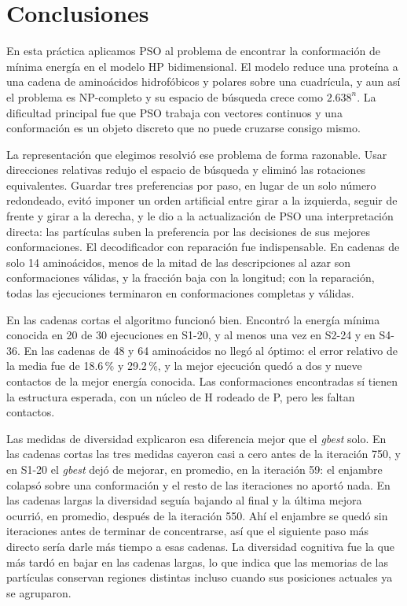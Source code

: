 \section{Conclusiones}

En esta práctica aplicamos PSO al problema de encontrar la conformación de mínima energía en el modelo HP bidimensional. El modelo reduce una proteína a una cadena de aminoácidos hidrofóbicos y polares sobre una cuadrícula, y aun así el problema es NP-completo y su espacio de búsqueda crece como $2.638^n$. La dificultad principal fue que PSO trabaja con vectores continuos y una conformación es un objeto discreto que no puede cruzarse consigo mismo.

La representación que elegimos resolvió ese problema de forma razonable. Usar direcciones relativas redujo el espacio de búsqueda y eliminó las rotaciones equivalentes. Guardar tres preferencias por paso, en lugar de un solo número redondeado, evitó imponer un orden artificial entre girar a la izquierda, seguir de frente y girar a la derecha, y le dio a la actualización de PSO una interpretación directa: las partículas suben la preferencia por las decisiones de sus mejores conformaciones. El decodificador con reparación fue indispensable. En cadenas de solo 14 aminoácidos, menos de la mitad de las descripciones al azar son conformaciones válidas, y la fracción baja con la longitud; con la reparación, todas las ejecuciones terminaron en conformaciones completas y válidas.

En las cadenas cortas el algoritmo funcionó bien. Encontró la energía mínima conocida en 20 de 30 ejecuciones en S1-20, y al menos una vez en S2-24 y en S4-36. En las cadenas de 48 y 64 aminoácidos no llegó al óptimo: el error relativo de la media fue de 18.6\,\% y 29.2\,\%, y la mejor ejecución quedó a dos y nueve contactos de la mejor energía conocida. Las conformaciones encontradas sí tienen la estructura esperada, con un núcleo de H rodeado de P, pero les faltan contactos.

Las medidas de diversidad explicaron esa diferencia mejor que el \textit{gbest} solo. En las cadenas cortas las tres medidas cayeron casi a cero antes de la iteración 750, y en S1-20 el \textit{gbest} dejó de mejorar, en promedio, en la iteración 59: el enjambre colapsó sobre una conformación y el resto de las iteraciones no aportó nada. En las cadenas largas la diversidad seguía bajando al final y la última mejora ocurrió, en promedio, después de la iteración 550. Ahí el enjambre se quedó sin iteraciones antes de terminar de concentrarse, así que el siguiente paso más directo sería darle más tiempo a esas cadenas. La diversidad cognitiva fue la que más tardó en bajar en las cadenas largas, lo que indica que las memorias de las partículas conservan regiones distintas incluso cuando sus posiciones actuales ya se agruparon.

